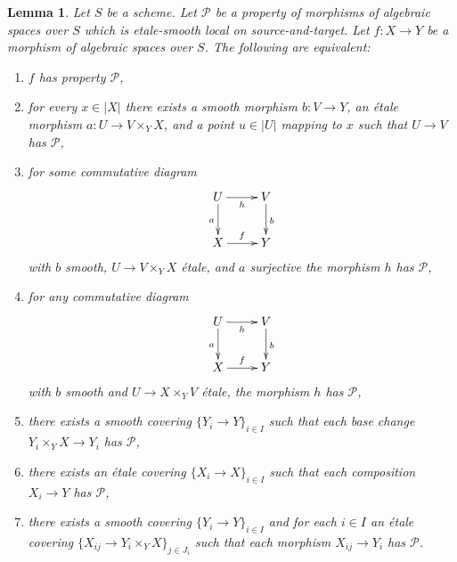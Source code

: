 \documentclass{stacks-project}
\theoremstyle{plain}
\newtheorem{lemma}[subsection]{Lemma}
\theoremstyle{definition}
\theoremstyle{remark}
\numberwithin{equation}{subsection}
\begin{document}
\begin{lemma}
\label{lemma-etale-smooth-local-source-target-characterize}
Let $S$ be a scheme.
Let $\mathcal{P}$ be a property of morphisms of algebraic spaces over $S$
which is etale-smooth local on source-and-target.
Let $f : X \to Y$ be a morphism
of algebraic spaces over $S$. The following are equivalent:
\begin{enumerate}
\item[(a)] $f$ has property $\mathcal{P}$,
\item[(b)] for every $x \in |X|$ there exists a smooth morphism $b : V \to Y$,
an \'etale morphism $a : U \to V \times_Y X$, and a point $u \in |U|$
mapping to $x$ such that $U \to V$ has $\mathcal{P}$,
\item[(c)] for some commutative diagram
$$
\xymatrix{
U \ar[d]_a \ar[r]_h & V \ar[d]^b \\
X \ar[r]^f & Y
}
$$
with $b$ smooth, $U \to V \times_Y X$ \'etale, and $a$ surjective
the morphism $h$ has $\mathcal{P}$,
\item[(d)] for any commutative diagram
$$
\xymatrix{
U \ar[d]_a \ar[r]_h & V \ar[d]^b \\
X \ar[r]^f & Y
}
$$
with $b$ smooth and $U \to X \times_Y V$ \'etale, the morphism $h$
has $\mathcal{P}$,
\item[(e)] there exists a smooth covering $\{Y_i \to Y\}_{i \in I}$ such
that each base change $Y_i \times_Y X \to Y_i$ has $\mathcal{P}$,
\item[(f)] there exists an \'etale covering $\{X_i \to X\}_{i \in I}$ such
that each composition $X_i \to Y$ has $\mathcal{P}$,
\item[(g)] there exists a smooth covering $\{Y_i \to Y\}_{i \in I}$ and
for each $i \in I$ an \'etale covering
$\{X_{ij} \to Y_i \times_Y X\}_{j \in J_i}$ such that each morphism
$X_{ij} \to Y_i$ has $\mathcal{P}$.
\end{enumerate}
\end{lemma}
\end{document}
